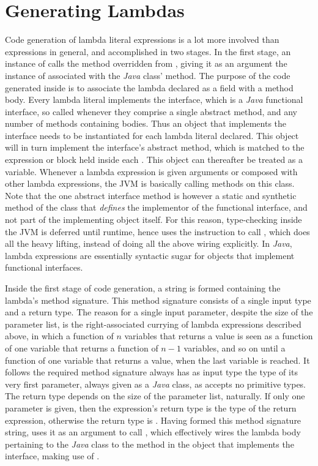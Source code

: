 \section{Generating Lambdas}

Code generation of lambda literal expressions is a lot more involved than expressions in general, and accomplished in two stages. In the first stage, an instance of  calls the  method overridden from , giving it as an argument the instance of  associated with the \emph{Java} class'  method. The purpose of the code generated inside  is to associate the lambda declared as a field with a method body. Every lambda literal implements the  interface, which is a \emph{Java} functional interface, so called whenever they comprise a single abstract method, and any number of methods containing bodies. Thus an object that implements the  interface needs to be instantiated for each lambda literal declared. This object will in turn implement the interface's abstract method, which is matched to the expression or block held inside each . This object can thereafter be treated as a variable. Whenever a lambda expression is given arguments or composed with other lambda expressions, the JVM is basically calling methods on this class. Note that the one abstract interface method is however a static and synthetic method of the class that \emph{defines} the implementor of the functional interface, and not part of the implementing object itself. For this reason, type-checking inside the JVM is deferred until runtime, hence  uses the  instruction to call , which does all the heavy lifting, instead of doing all the above wiring explicitly. In \emph{Java}, lambda expressions are essentially syntactic sugar for objects that implement functional interfaces.

Inside the first stage of code generation, a string is formed containing the lambda's method signature. This method signature consists of a single input type and a return type. The reason for a single input parameter, despite the size of the parameter list, is the right-associated currying of lambda expressions described above, in which a function of $n$ variables that returns a value is seen as a function of one variable that returns a function of $n - 1$ variables, and so on until a function of one variable that returns a value, when the last variable is reached. It follows the required method signature always has as input type the type of its very first parameter, always given as a \emph{Java} class, as  accepts no primitive types. The return type depends on the size of the parameter list, naturally. If only one parameter is given, then the expression's return type is the type of the return expression, otherwise the return type is . Having formed this method signature string,  uses it as an argument to call , which effectively wires the lambda body pertaining to the \emph{Java} class to the  method in the object that implements the  interface, making use of .

